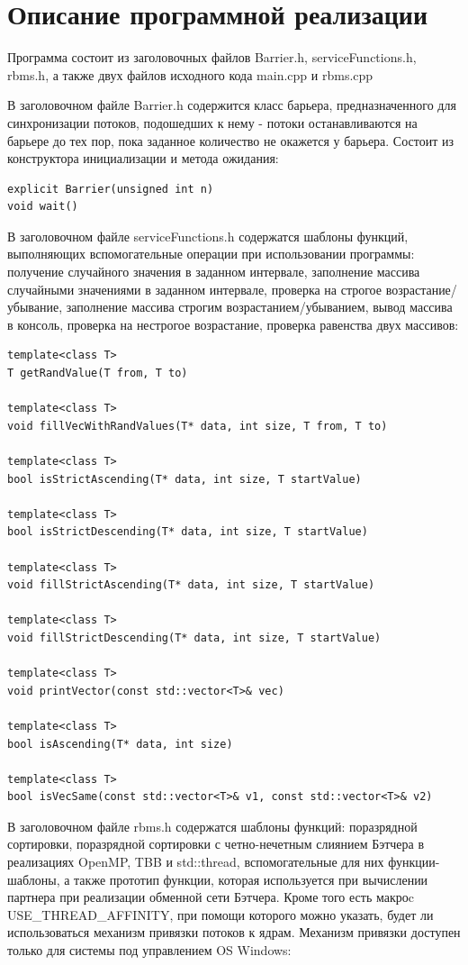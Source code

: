 \documentclass{report}
\begin{document}
\section*{Описание программной реализации}
\par Программа состоит из заголовочных файлов Barrier.h, serviceFunctions.h, rbms.h, а также двух файлов исходного кода main.cpp и rbms.cpp
\par В заголовочном файле Barrier.h содержится класс барьера, предназначенного для синхронизации потоков, подошедших к нему - потоки останавливаются на барьере до тех пор, пока заданное количество не окажется у барьера. Состоит из конструктора инициализации и метода ожидания:
\begin{lstlisting}
explicit Barrier(unsigned int n)
void wait()
\end{lstlisting}
\par В заголовочном файле serviceFunctions.h содержатся шаблоны функций, выполняющих вспомогательные операции при использовании программы: получение случайного значения в заданном интервале, заполнение массива случайными значениями в заданном интервале, проверка на строгое возрастание/убывание, заполнение массива строгим возрастанием/убыванием, вывод массива в консоль, проверка на нестрогое возрастание, проверка равенства двух массивов:
\begin{lstlisting}
template<class T>
T getRandValue(T from, T to)

template<class T>
void fillVecWithRandValues(T* data, int size, T from, T to)

template<class T>
bool isStrictAscending(T* data, int size, T startValue)

template<class T>
bool isStrictDescending(T* data, int size, T startValue)

template<class T>
void fillStrictAscending(T* data, int size, T startValue)

template<class T>
void fillStrictDescending(T* data, int size, T startValue)

template<class T>
void printVector(const std::vector<T>& vec)

template<class T>
bool isAscending(T* data, int size)

template<class T>
bool isVecSame(const std::vector<T>& v1, const std::vector<T>& v2)
\end{lstlisting}
\par В заголовочном файле rbms.h содержатся шаблоны функций: поразрядной сортировки, поразрядной сортировки с четно-нечетным слиянием Бэтчера в реализациях OpenMP, TBB и std::thread, вспомогательные для них функции-шаблоны, а также прототип функции, которая используется при вычислении партнера при реализации обменной сети Бэтчера. Кроме того есть макроc USE\_THREAD\_AFFINITY, при помощи которого можно указать, будет ли использоваться механизм привязки потоков к ядрам. Механизм привязки доступен только для системы под управлением OS Windows:
\end{document}
